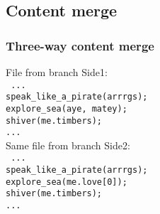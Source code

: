 \documentclass[compress,t]{beamer}
\begin{document}
\subsection{Content merge}

\begin{frame}
  \frametitle{Three-way content merge}

  \vspace*{-\baselineskip}
  \begin{multicols}{2}
    File from branch Side1:\\
    {\footnotesize\texttt{%
    \quad{}...                             \\
    \quad{}speak\_like\_a\_pirate(arrrgs); \\
    \quad{}explore\_sea(aye, matey);\\
    \quad{}shiver(me.timbers);             \\
    \quad{}...                             \\
    }}
    \columnbreak
    \pause
    Same file from branch Side2:\\
    {\footnotesize\texttt{%
    \quad{}...                             \\
    \quad{}speak\_like\_a\_pirate(arrrgs); \\
    \quad{}explore\_sea(me.love[0]);\\
    \quad{}shiver(me.timbers);             \\
    \quad{}...
    }}
  \end{multicols}%



\end{frame}
\end{document}
